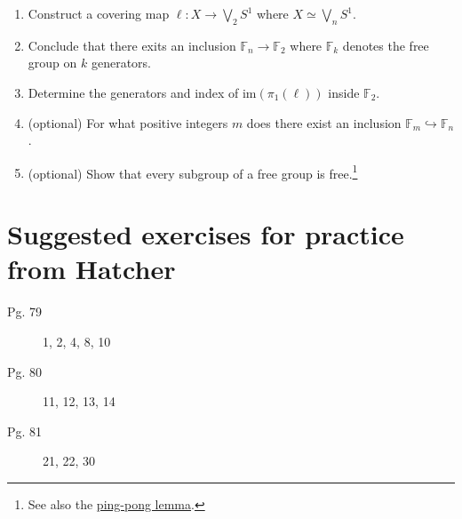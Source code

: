\documentclass{article}
\begin{document}
\begin{enumerate}
  \begin{enumerate}
  \item Construct a covering map $\ell: X \to \bigvee _2 S^1$ where $X \simeq \bigvee _n S^1$.
   \item Conclude that there exits an
     inclusion $\mathbb{F}_n \to \mathbb{F}_2$ where $\mathbb{F}_k$ denotes the
     free group on $k$ generators.
   \item Determine the generators and index of $\mathrm{im}(\pi_1(\ell))$ inside
     $\mathbb{F}_2$.
   \item (optional) For what positive integers $m$ does there exist an inclusion
     $\mathbb{F}_m \hookrightarrow \mathbb{F}_n$.
   \item (optional) Show that every subgroup of a free group is free.\footnote{See
       also the \href{https://en.wikipedia.org/wiki/Ping-pong_lemma}{ping-pong lemma}.}
  \end{enumerate}
\end{enumerate}

\newpage
\section*{Suggested exercises for practice from Hatcher}

\begin{description}
    \item[Pg. 79] 1, 2, 4, 8, 10
    \item[Pg. 80] 11, 12, 13, 14
    \item[Pg. 81] 21, 22, 30    
\end{description}
\end{document}
